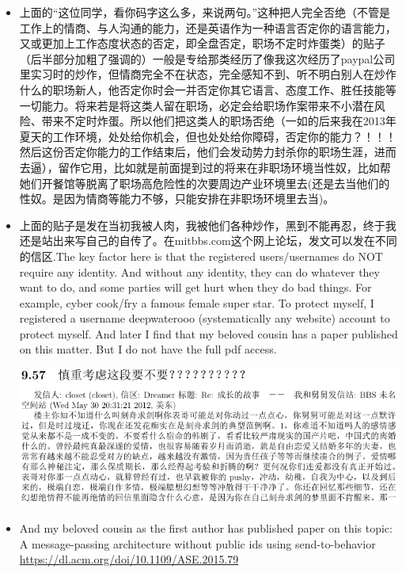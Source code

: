 \documentclass[9pt, b5paper]{article}
\begin{document}
\begin{enumerate}
\begin{enumerate}
\begin{itemize}
\item 上面的“这位同学，看你码字这么多，来说两句。”这种把人完全否绝（不管是工作上的情商、与人沟通的能力，还是英语作为一种语言否定你的语言能力，又或更加上工作态度状态的否定，即全盘否定，职场不定时炸蛋类）的贴子（后半部分加粗了强调的）一般是专给那类经历了像我这次经历了paypal公司里实习时的炒作，但情商完全不在状态，完全感知不到、听不明白别人在炒作什么的职场新人，他否定你时会一并否定你其它语言、态度工作、胜任技能等一切能力。将来若是将这类人留在职场，必定会给职场作案带来不小潜在风险、带来不定时炸蛋。所以他们把这类人的职场否绝（一如的后来我在2013年夏天的工作环境，处处给你机会，但也处处给你障碍，否定你的能力？！！！然后这份否定你能力的工作结束后，他们会发动势力封杀你的职场生涯，进而去逼），留作它用，比如就是前面提到过的将来在非职场环境当性奴，比如帮她们开餐馆等脱离了职场高危险性的次要周边产业环境里去(还是去当他们的性奴。是因为情商等能力不够，只能安排在非职场环境里去当)。
\item 上面的贴子是发在当初我被人肉，我被他们各种炒作，黑到不能再忍，终于我还是站出来写自己的自传了。在mitbbs.com这个网上论坛，发文可以发在不同的信区.The key factor here is that the registered users/usernames do NOT require any identity. And without any identity, they can do whatever they want to do, and some parties will get hurt when they do bad things. For example, cyber cook/fry a famous female super star. To protect myself, I registered a username deepwaterooo (systematically any website) account to protect myself. And later I find that my beloved cousin has a paper published on this matter. But I do not have the full pdf access. 

\includegraphics[width=.9\linewidth]{./pic/p1p108_NoIDsPosts.png}
\item And my beloved cousin as the first author has published paper on this topic: A message-passing architecture without public ids using send-to-behavior \url{https://dl.acm.org/doi/10.1109/ASE.2015.79}


\end{itemize}
\end{enumerate}
\end{enumerate}
\end{document}
